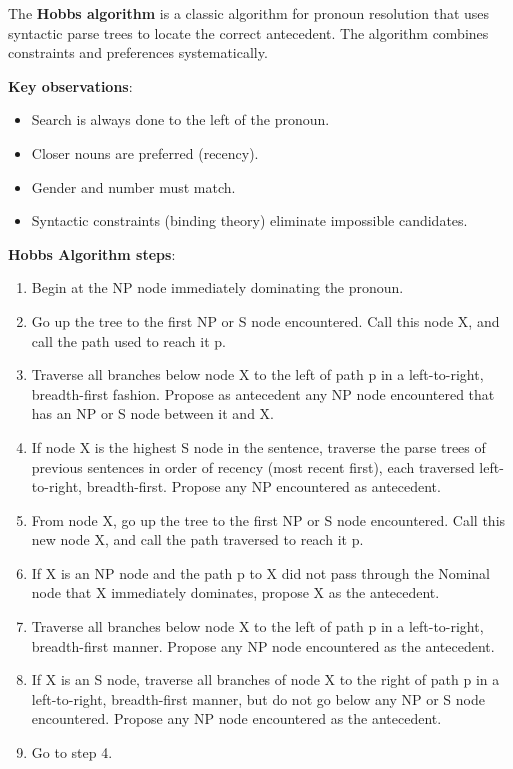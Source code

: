 \documentclass[11pt,a4paper]{article}
\begin{document}
The \textbf{Hobbs algorithm} is a classic algorithm for pronoun resolution that uses syntactic parse trees to locate the correct antecedent. The algorithm combines constraints and preferences systematically.

\textbf{Key observations}:
\begin{itemize}
    \item Search is always done to the left of the pronoun.
    \item Closer nouns are preferred (recency).
    \item Gender and number must match.
    \item Syntactic constraints (binding theory) eliminate impossible candidates.
\end{itemize}

\textbf{Hobbs Algorithm steps}:
\begin{enumerate}
    \item Begin at the NP node immediately dominating the pronoun.
    \item Go up the tree to the first NP or S node encountered. Call this node X, and call the path used to reach it p.
    \item Traverse all branches below node X to the left of path p in a left-to-right, breadth-first fashion. Propose as antecedent any NP node encountered that has an NP or S node between it and X.
    \item If node X is the highest S node in the sentence, traverse the parse trees of previous sentences in order of recency (most recent first), each traversed left-to-right, breadth-first. Propose any NP encountered as antecedent.
    \item From node X, go up the tree to the first NP or S node encountered. Call this new node X, and call the path traversed to reach it p.
    \item If X is an NP node and the path p to X did not pass through the Nominal node that X immediately dominates, propose X as the antecedent.
    \item Traverse all branches below node X to the left of path p in a left-to-right, breadth-first manner. Propose any NP node encountered as the antecedent.
    \item If X is an S node, traverse all branches of node X to the right of path p in a left-to-right, breadth-first manner, but do not go below any NP or S node encountered. Propose any NP node encountered as the antecedent.
    \item Go to step 4.
\end{enumerate}
\end{document}
